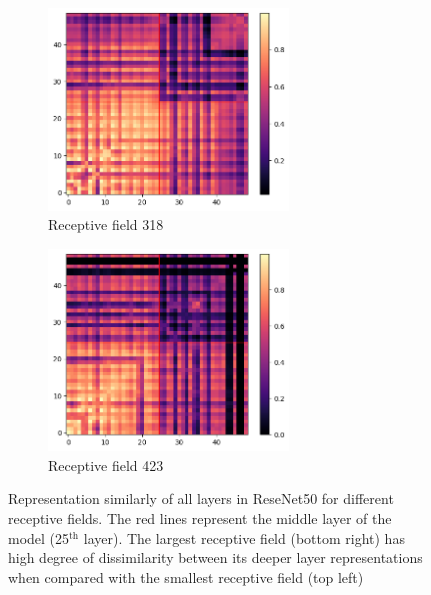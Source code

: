\begin{figure}[H]
        \begin{subfigure}[b]{0.475\textwidth}   
            \centering 
            \includegraphics[width=0.7\textwidth]{images/resnet50_level3_similarity_cifar10.png}
            \caption[]%
            {{\small Receptive field 318}}    
            \label{fig:similarity_lvl3}
        \end{subfigure}
        \hfill
        \begin{subfigure}[b]{0.475\textwidth}   
            \centering 
            \includegraphics[width=0.7\textwidth]{images/resnet50_level4_similarity_cifar10.png}
            \caption[]%
            {{\small Receptive field 423}}    
            \label{fig:similarity_lvl4}
        \end{subfigure}
        \caption[ The average and standard deviation of critical parameters ]
        {\small Representation similarly of all layers in ReseNet50 for different receptive fields. The red lines
        represent the middle layer of the model (25$^{\textrm{th}}$ layer). The largest receptive field (bottom right)
      has high degree of dissimilarity between its deeper layer representations when compared with the smallest
    receptive field (top left)}
        \label{fig:similarity_resenet50}
    \end{figure}



